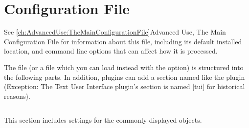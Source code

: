 

\chapter{Configuration File}
\label{sec:config.ini}
See \ref{ch:AdvancedUse:TheMainConfigurationFile}{Advanced Use, The
Main Configuration File} for information about this file, including its
default installed location, and command line options that can
affect how it is processed.


The file  (or a file which you can load instead with
the  option) is structured into the following
parts. In addition, plugins can add a section named like the plugin
(Exception: The Text User Interface plugin's section is named [tui]
for historical reasons).

\section{}
\label{sec:config.ini:astro}

This section includes settings for the commonly displayed objects.

